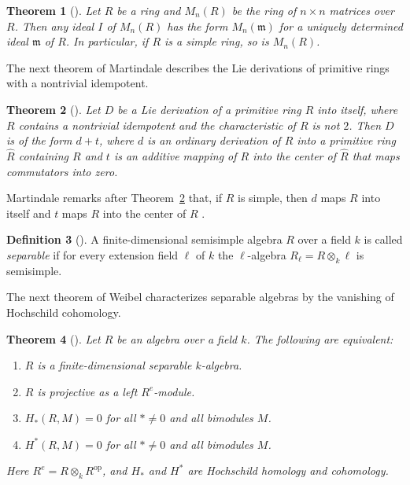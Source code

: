 \documentclass[]{interact}
\theoremstyle{plain}
\newtheorem{theorem}{Theorem}[section]
\theoremstyle{definition}
\newtheorem{definition}[theorem]{Definition}
\theoremstyle{remark}
\begin{document}
\begin{theorem}[{\citep[Theorem 3.1]{Lam2001}}]\label{thm:lam-matrix}
Let $R$ be a ring and $M_n(R)$ be the ring of $n \times n$ matrices over $R$. Then any ideal $I$ of $M_n(R)$ has the form $M_n(\mathfrak{m})$ for a uniquely determined ideal $\mathfrak{m}$ of $R$. In particular, if $R$ is a simple ring, so is $M_n(R)$.
\end{theorem}

The next theorem of Martindale describes the Lie derivations of primitive rings with a nontrivial idempotent. %

\begin{theorem}[{\citep[Theorem 2]{Martindale1964}}]\label{thm:martindale}
Let $D$ be a Lie derivation of a primitive ring $R$ into itself, where $R$ contains a nontrivial idempotent and the characteristic of $R$ is not $2$. Then $D$ is of the form $d + t$, where $d$ is an ordinary derivation of $R$ into a primitive ring $\hat{R}$ containing $R$ and $t$ is an additive mapping of $R$ into the center of $\hat{R}$ that maps commutators into zero.
\end{theorem}

Martindale remarks after Theorem~\ref{thm:martindale} that, if $R$ is simple, then $d$ maps $R$ into itself and $t$ maps $R$ into the center of $R$ \citep[p.~187]{Martindale1964}.

\begin{definition}[{\citep[Section 9.2.1]{Weibel1994}}]\label{def:separable}
A finite-dimensional semisimple algebra $R$ over a field $k$ is called \emph{separable} if for every extension field $\ell$ of $k$ the $\ell$-algebra $R_\ell = R \otimes_k \ell$ is semisimple.
\end{definition}

The next theorem of Weibel characterizes separable algebras by the vanishing of Hochschild cohomology. %

\begin{theorem}[{\citep[Theorem 9.2.11]{Weibel1994}}]\label{thm:hochschild}
Let $R$ be an algebra over a field $k$.
The following are equivalent:
\begin{enumerate}
\item $R$ is a finite-dimensional separable $k$-algebra.
\item $R$ is projective as a left $R^e$-module.
\item $H_*(R, M) = 0$ for all $* \neq 0$ and all bimodules $M$.
\item $H^*(R, M) = 0$ for all $* \neq 0$ and all bimodules $M$.
\end{enumerate}
Here $R^e = R \otimes_k R^{\mathrm{op}}$, and $H_*$ and $H^*$ are Hochschild homology and cohomology.
\end{theorem}
\end{document}
